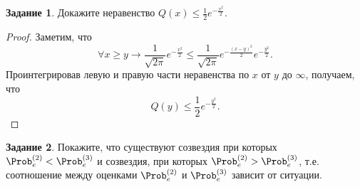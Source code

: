 \documentclass{book}
\numberwithin{theorem}{chapter}
\numberwithin{statement}{chapter}
\numberwithin{lemma}{chapter}
\theoremstyle{definition}
\newtheorem{task}{Задание}
\numberwithin{task}{chapter}
\theoremstyle{remark}
\numberwithin{example}{chapter}
\theoremstyle{definition}
\numberwithin{definition}{chapter}
\theoremstyle{remark}
\theoremstyle{remark}
\numberwithin{lyrics}{section}
\begin{document}
\begin{task} 
	Докажите неравенство $Q(x) \le \frac{1}{2} e^{-\frac{x^2}{2}}$.
\end{task}
\begin{proof}
	Заметим, что $$\forall x \ge y \rightarrow \frac{1}{\sqrt{2\pi}}e^{-\frac{x^2}{2}} \le \frac{1}{\sqrt{2\pi}} e^{-\frac{(x - y)^2}{2}} e^{-\frac{y^2}{2}}.$$
	Проинтегрировав левую и правую части неравенства по $x$ от $y$ до $\infty$, получаем, что
	$$
	Q(y) \le \frac{1}{2} e^{-\frac{y^2}{2}}.
	$$
\end{proof}
\begin{task}
\label{phy:task:est23} Покажите, что существуют созвездия при которых $\Prob^{(2)}_e < \Prob^{(3)}_e$ и созвездия, при которых $\Prob^{(2)}_e > \Prob^{(3)}_e$, т.е. соотношение между оценками $\Prob^{(2)}_e$ и $\Prob^{(3)}_e$ зависит от ситуации.
\end{task}
\end{document}
